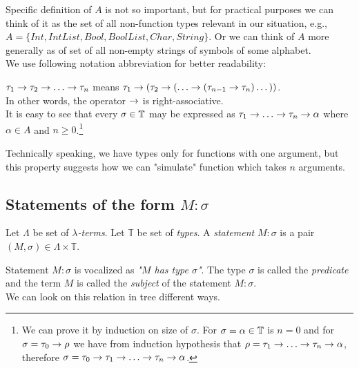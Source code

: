\documentclass[12pt,a4paper]{report}
\newcommand{\lterms}{$\lambda$-terms\xspace}
\begin{document}
Specific definition of $A$ is not so important, but for practical purposes 
we can think of it as the set of all non-function types relevant in our
situation, e.g., $A = \{ Int , IntList , Bool, BoolList , Char, String \}$.
Or we can think of $A$ more generally as of set of all non-empty strings
of symbols of some alphabet. \\

We use following notation
abbreviation for better readability:

$\tau_1 \ar \tau_2 \ar \dots \ar \tau_n$ means 
$\tau_1 \ar (\tau_2 \ar (\dots \ar (\tau_{n-1} \ar \tau_n)\dots))$.\\

In other words, the operator $\rightarrow$ is right-associative.\\

It is easy to see that every $\sigma \in \mathbb{T}$ may be expressed as 
$\tau_1 \ar \dots \ar \tau_n \ar \alpha$ 
where $\alpha \in A$ and $n \geq 0$.\footnote{ 
We can prove it by induction on size of $\sigma$. 
For $\sigma = \alpha \in \mathbb{T}$ is $n = 0$ and for $\sigma = \tau_0 \rightarrow \rho$
we have from induction hypothesis that $\rho = \tau_1 \ar \dots \ar \tau_n \ar \alpha$,
therefore
$\sigma = \tau_0 \ar \tau_1 \ar \dots \ar \tau_n \ar \alpha$.}

Technically speaking, we have types only for functions with one argument, but
this property suggests how we can "simulate" function which takes $n$ arguments.
  

	
\subsection{Statements of the form $M : \sigma$}

\begin{definition}
	Let $\Lambda$ be set of {\it \lterms}. 
	Let $\mathbb{T}$ be set of {\it types}.       
	A {\it statement} $M : \sigma$ is a pair 
	$(M,\sigma) \in \Lambda \times \mathbb{T}$.
	\\ 
\end{definition}
	
Statement $M : \sigma$ is vocalized as {\it "$M$ has type $\sigma$"}.
The type $\sigma$ is called the {\it predicate} and 
the term $M$ is called the {\it subject} of the statement $M : \sigma$. \\

We can look on this relation in tree different ways.
\end{document}
